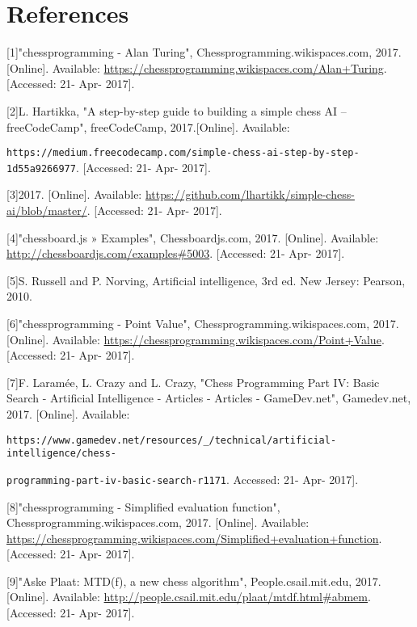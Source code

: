 \documentclass[11pt]{article}
\begin{document}
\section*{References}
\label{sec:orgb84d0f2}
[1]"chessprogramming - Alan Turing", Chessprogramming.wikispaces.com, 2017. [Online]. Available: \url{https://chessprogramming.wikispaces.com/Alan+Turing}. [Accessed: 21- Apr- 2017].

\vspace{2.5mm}
[2]L. Hartikka, "A step-by-step guide to building a simple chess AI – freeCodeCamp", freeCodeCamp, 2017.[Online]. Available:

\texttt{https://medium.freecodecamp.com/simple-chess-ai-step-by-step-1d55a9266977}. [Accessed: 21- Apr- 2017].

\vspace{2.5mm}
[3]2017. [Online]. Available: \url{https://github.com/lhartikk/simple-chess-ai/blob/master/}. [Accessed: 21- Apr- 2017].

\vspace{2.5mm}
[4]"chessboard.js » Examples", Chessboardjs.com, 2017. [Online]. Available: \url{http://chessboardjs.com/examples\#5003}. [Accessed: 21- Apr- 2017].

\vspace{2.5mm}
[5]S. Russell and P. Norving, Artificial intelligence, 3rd ed. New Jersey: Pearson, 2010.

\vspace{2.5mm}
[6]"chessprogramming - Point Value", Chessprogramming.wikispaces.com, 2017. [Online]. Available: \url{https://chessprogramming.wikispaces.com/Point+Value}. [Accessed: 21- Apr- 2017].

\vspace{2.5mm}
[7]F. Laramée, L. Crazy and L. Crazy, "Chess Programming Part IV: Basic Search - Artificial Intelligence - Articles - Articles - GameDev.net", Gamedev.net, 2017. [Online]. Available: 

\texttt{https://www.gamedev.net/resources/\_/technical/artificial-intelligence/chess-}

\texttt{programming-part-iv-basic-search-r1171}. Accessed: 21- Apr- 2017].

\vspace{2.5mm}
[8]"chessprogramming - Simplified evaluation function", Chessprogramming.wikispaces.com, 2017. [Online]. Available: \url{https://chessprogramming.wikispaces.com/Simplified+evaluation+function}. [Accessed: 21- Apr- 2017].

\vspace{2.5mm}
[9]"Aske Plaat: MTD(f), a new chess algorithm", People.csail.mit.edu, 2017. [Online]. Available: \url{http://people.csail.mit.edu/plaat/mtdf.html\#abmem}. [Accessed: 21- Apr- 2017].
\end{document}
